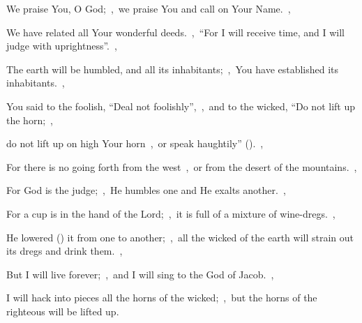 \documentclass[12pt,twoside,a5paper]{article}
\begin{document}
\begin{normalparskip}
  We praise You, O God;~\sep\ we praise You and call on Your Name.~\sep


  We have related all Your wonderful deeds.~\sep\ ``For I will receive time, and I will judge with uprightness''.~\sep

  The earth will be humbled, and all its inhabitants;~\sep\ You have established its inhabitants.~\sep

  You said to the foolish, ``Deal not foolishly'',~\sep\ and to the wicked, ``Do not lift up the horn;~\sep

  do not lift up on high Your horn~\sep\ or speak haughtily'' ().~\sep

  For there is no going forth from the west~\sep\ or from the desert of the mountains.~\sep

  For God is the judge;~\sep\ He humbles one and He exalts another.~\sep

  For a cup is in the hand of the Lord;~\sep\ it is full of a mixture of wine-dregs.~\sep

  He lowered () it from one to another;~\sep\ all the wicked of the earth will strain out its dregs and drink them.~\sep

  But I will live forever;~\sep\ and I will sing to the God of Jacob.~\sep

  I will hack into pieces all the horns of the wicked;~\sep\ but the horns of the righteous will be lifted up.
\end{normalparskip}

\end{document}
